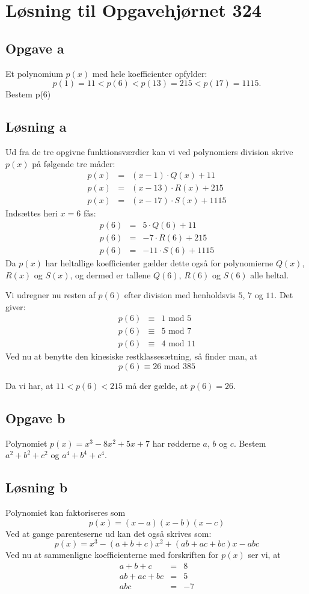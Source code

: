 \documentclass[12pt,oneside,a4paper]{article}
\newcommand{\bas}{\begin{eqnarray*}}
\newcommand{\eas}{\end{eqnarray*}}
\newcommand{\mod}{\mbox{mod}}
\begin{document}
\section*{Løsning til Opgavehjørnet 324}

\subsection*{Opgave a}
Et polynomium $p(x)$ med hele koefficienter opfylder:
$$
p(1) = 11 < p(6) < p(13) = 215 < p(17) = 1115.
$$
Bestem p(6)

\subsection*{Løsning a}
Ud fra de tre opgivne funktionsværdier kan vi ved polynomiers division skrive $p(x)$ på følgende tre måder:
\bas
p(x) &=& (x-1) \cdot Q(x) + 11 \\
p(x) &=& (x-13) \cdot R(x) + 215 \\
p(x) &=& (x-17) \cdot S(x) + 1115
\eas
Indsættes heri $x=6$ fås:
\bas
p(6) &=& 5 \cdot Q(6) + 11 \\
p(6) &=& -7 \cdot R(6) + 215 \\
p(6) &=& -11 \cdot S(6) + 1115
\eas
Da $p(x)$ har heltallige koefficienter gælder dette også for polynomierne $Q(x)$, $R(x)$ og $S(x)$, og dermed er tallene $Q(6)$, $R(6)$ og $S(6)$ alle heltal.

Vi udregner nu resten af $p(6)$ efter division med henholdsvis $5$, $7$ og $11$. Det giver:
\bas
p(6) &\equiv& 1 \,\,\mod\,\,  5\\
p(6) &\equiv& 5 \,\,\mod\,\,  7\\
p(6) &\equiv& 4 \,\,\mod\,\, 11
\eas
Ved nu at benytte den kinesiske restklassesætning, så finder man, at
$$
p(6) \equiv 26 \,\,\mod\,\, 385
$$

Da vi har, at $11 < p(6) < 215$ må der gælde, at $p(6) = 26$.

\subsection*{Opgave b}
Polynomiet $p(x) = x^3 - 8x^2 + 5x + 7$ har rødderne $a$, $b$ og $c$. Bestem 
$a^2+b^2+c^2$ og $a^4+b^4+c^4$.

\subsection*{Løsning b}
Polynomiet kan faktoriseres som
$$
p(x) = (x-a)(x-b)(x-c)
$$
Ved at gange parenteserne ud kan det også skrives som:
$$
p(x) = x^3 - (a+b+c) x^2 + (ab+ac+bc) x - abc
$$
Ved nu at sammenligne koefficienterne med forskriften for $p(x)$ ser vi, at
\bas
a+b+c &=& 8 \\
ab+ac+bc &=& 5 \\
abc &=& -7
\eas
\end{document}
